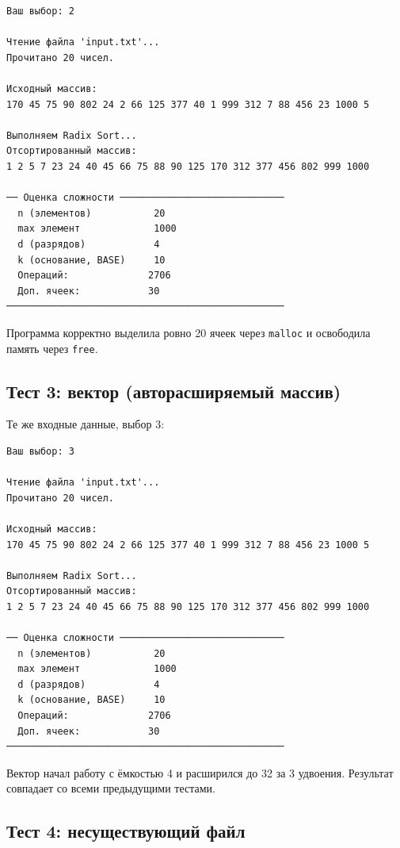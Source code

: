 \documentclass[a4paper,14pt]{extarticle}
\begin{document}
\begin{Verbatim}[frame=single,fontsize=\footnotesize]
Ваш выбор: 2

Чтение файла 'input.txt'...
Прочитано 20 чисел.

Исходный массив:
170 45 75 90 802 24 2 66 125 377 40 1 999 312 7 88 456 23 1000 5

Выполняем Radix Sort...
Отсортированный массив:
1 2 5 7 23 24 40 45 66 75 88 90 125 170 312 377 456 802 999 1000

── Оценка сложности ─────────────────────────────
  n (элементов)           20
  max элемент             1000
  d (разрядов)            4
  k (основание, BASE)     10
  Операций:              2706
  Доп. ячеек:            30
─────────────────────────────────────────────────
\end{Verbatim}

Программа корректно выделила ровно 20 ячеек через \texttt{malloc} и освободила память через \texttt{free}.

\subsection{Тест 3: вектор (авторасширяемый массив)}

Те же входные данные, выбор 3:

\begin{Verbatim}[frame=single,fontsize=\footnotesize]
Ваш выбор: 3

Чтение файла 'input.txt'...
Прочитано 20 чисел.

Исходный массив:
170 45 75 90 802 24 2 66 125 377 40 1 999 312 7 88 456 23 1000 5

Выполняем Radix Sort...
Отсортированный массив:
1 2 5 7 23 24 40 45 66 75 88 90 125 170 312 377 456 802 999 1000

── Оценка сложности ─────────────────────────────
  n (элементов)           20
  max элемент             1000
  d (разрядов)            4
  k (основание, BASE)     10
  Операций:              2706
  Доп. ячеек:            30
─────────────────────────────────────────────────
\end{Verbatim}

Вектор начал работу с ёмкостью 4 и расширился до 32 за 3 удвоения. Результат совпадает со всеми предыдущими тестами.

\subsection{Тест 4: несуществующий файл}
\end{document}
